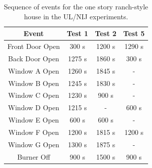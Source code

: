 \begin{table}[ht!]
\begin{center}
\begin{tabular}{|c||c|c|c|}
\hline
Event          & Test 1     & Test 2    & Test 5    \\ \hline \hline
Front Door Open & 300 s    & 1200 s    & 1290 s    \\ \hline
Back Door Open  & 1275 s    & 1860 s    & 300 s    \\ \hline
Window A Open     & 1260 s    & 1845 s    & -       \\ \hline
Window B Open     & 1245 s    & 1830 s    & -       \\ \hline
Window C Open     & 1230 s    & 900 s    & -       \\ \hline
Window D Open     & 1215 s    & -       & 600 s    \\ \hline
Window E Open     & 600 s    & 600 s    & -       \\ \hline
Window F Open     & 1200 s    & 1815 s    & 1200 s    \\ \hline
Window G Open     & 1300 s    & 1875 s    & -       \\ \hline
Burner Off       & 900 s    & 1500 s    & 900 s    \\ \hline
\end{tabular}
\end{center}
\caption[Sequence of events for the one story ranch-style house in the UL/NIJ experiments]
{Sequence of events for the one story ranch-style house in the UL/NIJ experiments.}
\label{Ranch_events}
\end{table}

